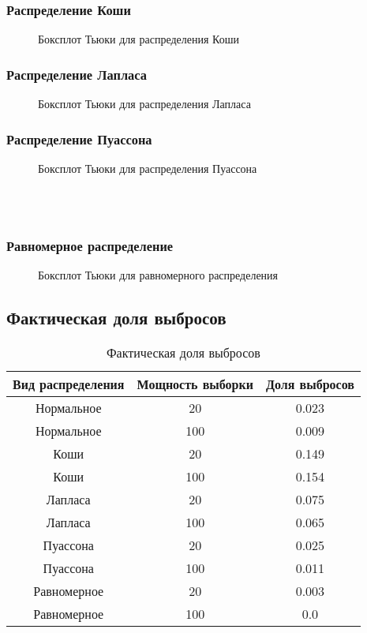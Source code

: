 \documentclass{article}
\begin{document}
\subsubsection{Распределение Коши}
\begin{figure}[h]
\caption{Боксплот Тьюки для распределения Коши}
\end{figure}
\subsubsection{Распределение Лапласа}
\begin{figure}[h]
\caption{Боксплот Тьюки для распределения Лапласа}
\end{figure}
\subsubsection{Распределение Пуассона}
\begin{figure}[h]
\caption{Боксплот Тьюки для распределения Пуассона}
\end{figure}
\; \\ \; \\ \;
\subsubsection{Равномерное распределение}
\begin{figure}[h]
\caption{Боксплот Тьюки для равномерного распределения}
\end{figure}
\subsection{Фактическая доля выбросов}
\begin{table}[hb]
\begin{center}
\begin{tabular}{|c|c|c|}
\hline 
Вид распределения & Мощность выборки & Доля выбросов \\ 
\hline 
Нормальное & 20 & 0.023 \\ 
\hline 
Нормальное & 100 & 0.009 \\ 
\hline 
Коши & 20 & 0.149 \\ 
\hline 
Коши & 100 & 0.154 \\ 
\hline 
Лапласа & 20 & 0.075 \\ 
\hline 
Лапласа & 100 & 0.065 \\ 
\hline 
Пуассона & 20 & 0.025 \\ 
\hline 
Пуассона & 100 & 0.011 \\ 
\hline 
Равномерное & 20 & 0.003 \\ 
\hline 
Равномерное & 100 & 0.0 \\ 
\hline 
\end{tabular} 
\caption{Фактическая доля выбросов}
\end{center}
\end{table}
\; \\ \; \\ \; \\ \; \\ \; 
\end{document}

